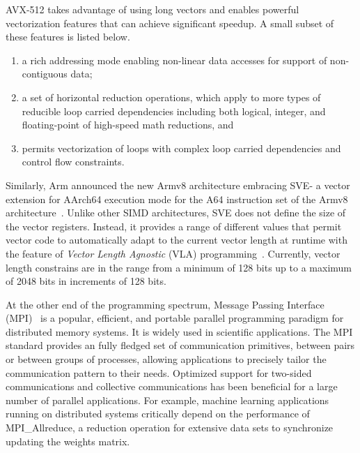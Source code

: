 \documentclass[5p,times,twocolumn]{elsarticle}
\newcommand{\mpi}[0]{\textsc{MPI}\xspace}
\newcommand{\arm}[0]{Arm\xspace}
\newcommand{\sve}[0]{\textsc{SVE}\xspace}
\begin{document}
AVX-512 takes advantage of using long vectors and enables powerful
vectorization features that can achieve significant speedup. A small subset of these features is listed below.
\begin{enumerate}
  \item a rich addressing mode enabling non-linear data accesses for support of non-contiguous data;
  \item a set of horizontal reduction operations, which apply to more
  types of reducible loop carried dependencies including both logical, integer,
  and floating-point of high-speed math reductions, and
  \item permits vectorization of loops with complex loop carried dependencies and control flow constraints.
\end{enumerate}

Similarly, \arm announced the new Armv8 architecture embracing \sve - a vector extension for AArch64
execution mode for the A64 instruction set of the
Armv8 architecture~\cite{arm-v8-ref, ARMv8-Architecture}.
Unlike other SIMD architectures, \sve does not define the size of
the vector registers. Instead, it provides a range of different values that permit vector
code to automatically adapt to the current vector length at runtime with the
feature of \emph{Vector Length Agnostic} (VLA) programming~\cite{Advanced-SIMD,vla-stencil}.
Currently, vector length constrains are in the range from a minimum of 128 bits up to
a maximum of 2048 bits in increments of 128 bits.

At the other end of the programming spectrum, Message Passing Interface
(\mpi)~\cite{mpi-forum} is a popular, efficient, and portable parallel programming
paradigm for distributed memory systems. It is widely used in scientific applications.
The MPI standard provides an fully fledged set of communication primitives, between pairs or between groups of processes,
allowing applications to precisely tailor the communication pattern to their needs.
Optimized support for two-sided communications and
collective communications has been beneficial for a large number of parallel applications. %
For example, machine learning applications running on distributed systems
critically depend on the performance of  MPI\_Allreduce, a reduction operation
for extensive data sets to synchronize updating the weights matrix.
\end{document}
